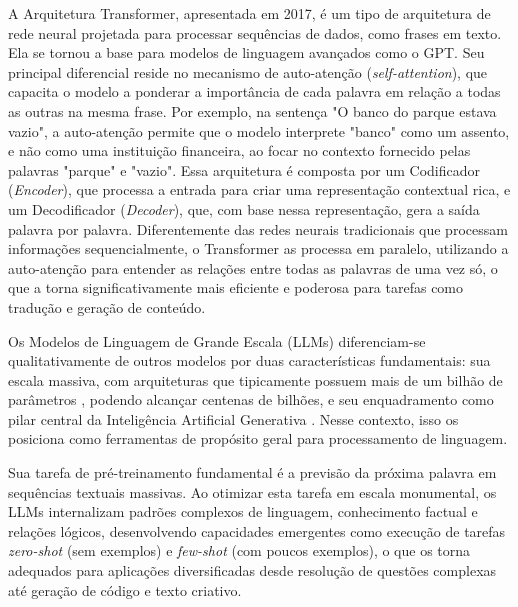 \documentclass[brazilian, spanish, english]{RBIEarticle}
\begin{document}

A Arquitetura Transformer, apresentada em 2017, é um tipo de arquitetura de rede neural projetada para processar sequências de dados, como frases em texto. Ela se tornou a base para modelos de linguagem avançados como o GPT. Seu principal diferencial reside no mecanismo de auto-atenção (\textit{self-attention}), que capacita o modelo a ponderar a importância de cada palavra em relação a todas as outras na mesma frase. Por exemplo, na sentença "O banco do parque estava vazio", a auto-atenção permite que o modelo interprete "banco" como um assento, e não como uma instituição financeira, ao focar no contexto fornecido pelas palavras "parque" e "vazio". Essa arquitetura é composta por um Codificador (\textit{Encoder}), que processa a entrada para criar uma representação contextual rica, e um Decodificador (\textit{Decoder}), que, com base nessa representação, gera a saída palavra por palavra. Diferentemente das redes neurais tradicionais que processam informações sequencialmente, o Transformer as processa em paralelo, utilizando a auto-atenção para entender as relações entre todas as palavras de uma vez só, o que a torna significativamente mais eficiente e poderosa para tarefas como tradução e geração de conteúdo.


Os Modelos de Linguagem de Grande Escala (LLMs) diferenciam-se qualitativamente de outros modelos por duas características fundamentais: sua escala massiva, com arquiteturas que tipicamente possuem mais de um bilhão de parâmetros \parencite{zhao2023survey}, podendo alcançar centenas de bilhões, e seu enquadramento como pilar central da Inteligência Artificial Generativa \parencite{caseli2024processamento}. Nesse contexto, isso os posiciona como ferramentas de propósito geral para processamento de linguagem.

Sua tarefa de pré-treinamento fundamental é a previsão da próxima palavra em sequências textuais massivas. Ao otimizar esta tarefa em escala monumental, os LLMs internalizam padrões complexos de linguagem, conhecimento factual e relações lógicos, desenvolvendo capacidades emergentes como execução de tarefas \textit{zero-shot} (sem exemplos) e \textit{few-shot} (com poucos exemplos), o que os torna adequados para aplicações diversificadas desde resolução de questões complexas até geração de código e texto criativo.

\end{document}
